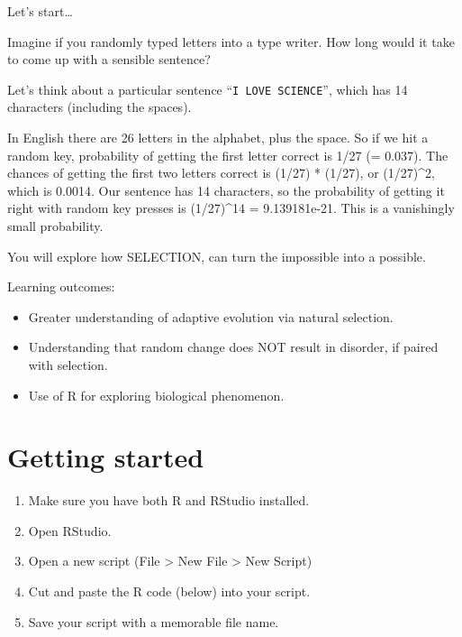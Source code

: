 \documentclass[
  a4paper]{book}
\providecommand{\tightlist}{%
  \setlength{\itemsep}{0pt}\setlength{\parskip}{0pt}}
\begin{document}
Let's start\ldots{}

Imagine if you randomly typed letters into a type writer. How long would it take to come up with a sensible sentence?

Let's think about a particular sentence ``\texttt{I\ LOVE\ SCIENCE}'', which has 14 characters (including the spaces).

In English there are 26 letters in the alphabet, plus the space. So if we hit a random key, probability of getting the first letter correct is 1/27 (= 0.037).
The chances of getting the first two letters correct is (1/27) * (1/27), or (1/27)\^{}2, which is 0.0014. Our sentence has 14 characters, so the probability of getting it right with random key presses is (1/27)\^{}14 = 9.139181e-21. This is a vanishingly small probability.

You will explore how SELECTION, can turn the impossible into a possible.

\begin{do-something}
Learning outcomes:

\begin{itemize}
\tightlist
\item
  Greater understanding of adaptive evolution via natural selection.
\item
  Understanding that random change does NOT result in disorder, if
  paired with selection.
\item
  Use of R for exploring biological phenomenon.
\end{itemize}
\end{do-something}

\hypertarget{getting-started}{%
\section{Getting started}\label{getting-started}}

\begin{enumerate}
\def\labelenumi{\arabic{enumi}.}
\setcounter{enumi}{-1}
\tightlist
\item
  Make sure you have both R and RStudio installed.
\item
  Open RStudio.
\item
  Open a new script (File \textgreater{} New File \textgreater{} New Script)
\item
  Cut and paste the R code (below) into your script.
\item
  Save your script with a memorable file name.
\end{enumerate}
\end{document}
